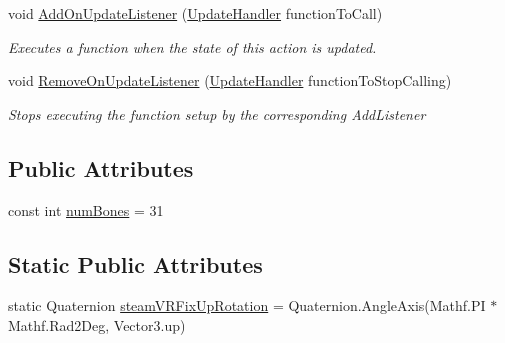 \begin{DoxyCompactItemize}
void \mbox{\hyperlink{class_valve_1_1_v_r_1_1_steam_v_r___action___skeleton_a0016992d8adb267fcdd385487bcde9bd}{Add\+On\+Update\+Listener}} (\mbox{\hyperlink{class_valve_1_1_v_r_1_1_steam_v_r___action___skeleton_a9fd666c2f3ccefc435275d85c525337c}{Update\+Handler}} function\+To\+Call)
\begin{DoxyCompactList}\small\item\em Executes a function when the state of this action is updated. \end{DoxyCompactList}\item 
void \mbox{\hyperlink{class_valve_1_1_v_r_1_1_steam_v_r___action___skeleton_ae663ccb6de66ea17fa2e21a8c02e78eb}{Remove\+On\+Update\+Listener}} (\mbox{\hyperlink{class_valve_1_1_v_r_1_1_steam_v_r___action___skeleton_a9fd666c2f3ccefc435275d85c525337c}{Update\+Handler}} function\+To\+Stop\+Calling)
\begin{DoxyCompactList}\small\item\em Stops executing the function setup by the corresponding Add\+Listener \end{DoxyCompactList}\end{DoxyCompactItemize}
\subsection*{Public Attributes}
\begin{DoxyCompactItemize}
\item 
const int \mbox{\hyperlink{class_valve_1_1_v_r_1_1_steam_v_r___action___skeleton_ab60abde1a0e0993a1a15c03554a5671a}{num\+Bones}} = 31
\end{DoxyCompactItemize}
\subsection*{Static Public Attributes}
\begin{DoxyCompactItemize}
\item 
static Quaternion \mbox{\hyperlink{class_valve_1_1_v_r_1_1_steam_v_r___action___skeleton_a225dced4bc63fd5db949d8b9ec44f30e}{steam\+V\+R\+Fix\+Up\+Rotation}} = Quaternion.\+Angle\+Axis(Mathf.\+PI $\ast$ Mathf.\+Rad2\+Deg, Vector3.\+up)
\end{DoxyCompactItemize}
